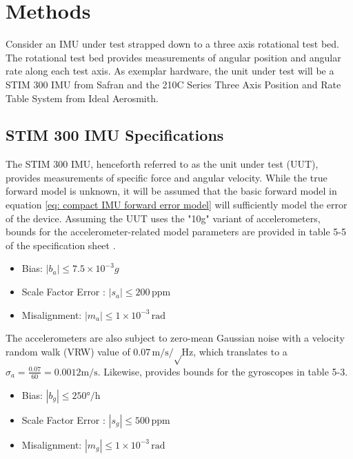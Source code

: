 
\begingroup
\allowdisplaybreaks

\section{Methods}

 Consider an IMU under test strapped down to a three axis rotational test bed. The rotational test bed provides measurements of angular position and angular rate along each test axis. As exemplar hardware, the unit under test will be a STIM 300 IMU from Safran and the 210C Series Three Axis Position and Rate Table System from Ideal Aerosmith.


\subsection{STIM 300 IMU Specifications} \label{sec: stim 300 imu specifications}
 
The STIM 300 IMU, henceforth referred to as the unit under test (UUT), provides measurements of specific force and angular velocity. While the true forward model is unknown, it will be assumed that the basic forward model in equation \ref{eq: compact IMU forward error model} will sufficiently model the error of the device. Assuming the UUT uses the "10g" variant of accelerometers, bounds for the accelerometer-related model parameters are provided in table 5-5 of the specification sheet \cite{stim300SpecSheet}.
 
\begin{itemize}
	\item Bias: $|b_a| \leq 7.5 \times 10^{-3} g$
	\item Scale Factor Error : $|s_a| \leq 200 \,\textrm{ppm}$
	\item Misalignment: $|m_a| \leq 1\times 10^{-3} \,\textrm{rad}$ 
\end{itemize}
 
The accelerometers are also subject to zero-mean Gaussian noise with a velocity random walk (VRW) value of $0.07 \unit{\meter\per\second\per\sqrt\hertz}$, which translates to a $\sigma_a = \frac{0.07}{60} = 0.0012 \unit{\meter\per\second}$. Likewise, \cite{stim300SpecSheet} provides bounds for the gyroscopes in table 5-3. 
 
\begin{itemize}
	\item Bias: $|b_g| \leq 250 \unit{\degree\per\hour}$
	\item Scale Factor Error : $|s_g| \leq 500 \,\textrm{ppm}$
	\item Misalignment: $|m_g| \leq 1\times 10^{-3} \,\textrm{rad}$ 
\end{itemize}
 
